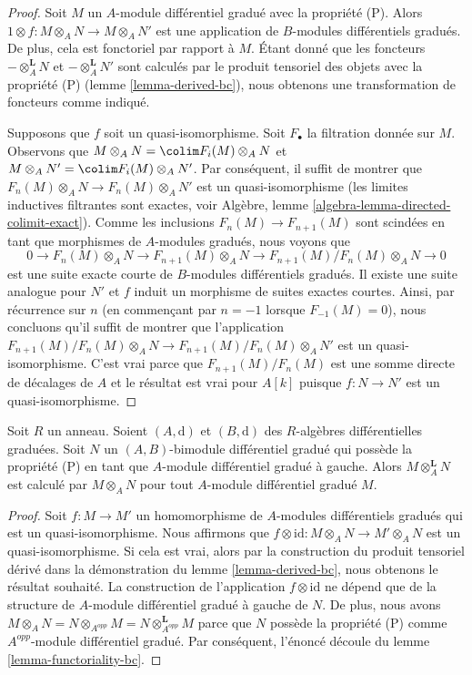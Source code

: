 \begin{proof}
Soit $M$ un $A$-module différentiel gradué avec la propriété (P).
Alors $1 \otimes f : M \otimes_A N \to M \otimes_A N'$ est une
application de $B$-modules différentiels gradués. De plus, cela est fonctoriel par
rapport à $M$. Étant donné que les foncteurs $-
\otimes_A^\mathbf{L} N$ et $- \otimes_A^\mathbf{L} N'$ sont calculés par
le produit tensoriel des objets avec la propriété (P)
(lemme \ref{lemma-derived-bc}), nous obtenons une transformation de foncteurs comme
indiqué.

\medskip\noindent
Supposons que $f$ soit un quasi-isomorphisme. Soit $F_\bullet$ la
filtration donnée sur $M$. Observons que $M
\otimes_A N = \colim F_i(M) \otimes_A N$ et $M \otimes_A N'
= \colim F_i(M) \otimes_A N'$. Par conséquent, il
suffit de montrer que $F_n(M) \otimes_A
N \to F_n(M) \otimes_A N'$ est un
quasi-isomorphisme (les limites inductives filtrantes sont exactes, voir Algèbre,
lemme \ref{algebra-lemma-directed-colimit-exact}). Comme les
inclusions $F_n(M) \to F_{n + 1}(M)$ sont scindées en tant que
morphismes de $A$-modules gradués, nous voyons que
$$
0 \to F_n(M) \otimes_A N \to F_{n + 1}(M) \otimes_A N \to
F_{n + 1}(M)/F_n(M) \otimes_A N \to 0
$$
est une suite exacte courte de $B$-modules différentiels gradués. Il
existe une suite analogue pour $N'$ et $f$ induit un morphisme de
suites exactes courtes. Ainsi, par récurrence sur $n$ (en commençant par $n = -1$
lorsque $F_{-1}(M) = 0$), nous concluons qu'il suffit de montrer que
l'application $F_{n + 1}(M)/F_n(M) \otimes_A N \to F_{n + 1}(M)/F_n(M) \otimes_A N'$ est un
quasi-isomorphisme. C'est vrai parce que $F_{n + 1}(M)/F_n(M)$ est une
somme directe de décalages de $A$ et le résultat est vrai pour $A[k]$ puisque
$f : N \to N'$ est un quasi-isomorphisme.
\end{proof}

\begin{lemma}
\label{lemma-compute-bc}
Soit $R$ un anneau. Soient $(A, \text{d})$ et $(B, \text{d})$ des
$R$-algèbres différentielles graduées. Soit $N$ un $(A, B)$-bimodule
différentiel gradué qui possède la propriété (P) en tant que $A$-module différentiel
gradué à gauche. Alors $M \otimes_A^\mathbf{L} N$ est calculé
par $M \otimes_A N$ pour tout $A$-module différentiel gradué $M$.
\end{lemma}

\begin{proof}
Soit $f : M \to M'$ un homomorphisme de $A$-modules différentiels gradués qui
est un quasi-isomorphisme. Nous affirmons que $f \otimes \text{id} : M
\otimes_A N \to M' \otimes_A N$ est un quasi-isomorphisme. Si cela est
vrai, alors par la construction du produit tensoriel dérivé dans la
démonstration du lemme \ref{lemma-derived-bc}, nous obtenons le résultat souhaité. La
construction de l'application $f \otimes \text{id}$ ne dépend que de la
structure de $A$-module différentiel gradué à gauche de $N$. De
plus, nous avons $M \otimes_A N = N \otimes_{A^{opp}} M = N
\otimes_{A^{opp}}^\mathbf{L} M$ parce que $N$ possède la propriété (P) comme
$A^{opp}$-module différentiel gradué. Par conséquent, l'énoncé découle du
lemme \ref{lemma-functoriality-bc}.
\end{proof}

